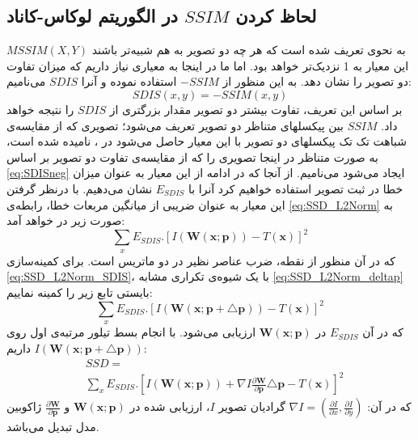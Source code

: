 \documentclass[11pt,a4paper,twocolumn]{article}
\newcommand{\warp}{\mathbf{W}(\mathbf{x};\mathbf{p})}
\newcommand{\IWarp}{I(\mathbf{W}(\mathbf{x};\mathbf{p}))}
\newcommand{\round}[2]{\frac{\partial{#1}}{\partial{#2}}}
\newcommand{\roundB}[2]{\frac{\partial{\mathbf{#1}}}{\partial{\mathbf{#2}}}}
\begin{document}
\subsection{لحاظ کردن $SSIM$ در الگوریتم لوکاس-کاناد}
$MSSIM(X,Y)$ به نحوی تعریف شده است که هر چه دو تصویر به هم شبیه‌تر باشند این معیار به 1 نزدیک‌تر خواهد بود. اما ما در اینجا به معیاری نیاز داریم که میزان تفاوت دو تصویر را نشان دهد. به این منظور از $-SSIM$ استفاده نموده و آنرا $SDIS$ می‌نامیم:
\begin{equation}\label{eq:SDISneg}
    SDIS(x,y) = -SSIM(x,y)
\end{equation}
بر اساس این تعریف، تفاوت بیشتر دو تصویر مقدار بزرگتری از $SDIS$ را نتیجه خواهد داد.
$SSIM$ بین پیکسلهای متناظر دو تصویر تعریف می‌شود؛ تصویری که از مقایسه‌ی شباهت تک‌ تک پیکسلهای دو تصویر با این معیار حاصل می‌شود در \cite{Wang04image}،  نامیده شده است، به صورت متناظر در اینجا تصویری را که از مقایسه‌ی تفاوت دو تصویر بر اساس \eqref{eq:SDISneg} ایجاد می‌شود  می‌نامیم. از آنجا که در ادامه از این معیار به عنوان میزان خطا در ثبت تصویر استفاده خواهیم کرد آنرا با $E_{SDIS}$ نشان می‌دهیم.  با درنظر گرفتن این معیار به عنوان ضریبی از میانگین مربعات خطا، رابطه‌ی \eqref{eq:SSD_L2Norm} به صورت زیر در خواهد آمد:
\begin{equation}\label{eq:SSD_L2Norm_SDIS}
    \sum_x E_{SDIS}.[\IWarp-T(\mathbf{x})]^2
\end{equation}
که در آن منظور از نقطه، ضرب عناصر نظیر در دو ماتریس است. برای کمینه‌سازی \eqref{eq:SSD_L2Norm_SDIS}، با یک شیوه‌ی تکراری مشابه \eqref{eq:SSD_L2Norm_deltap} بایستی تابع زیر را کمینه نماییم:
\begin{equation}\label{eq:SSD_SDIS_deltap}
    \sum_x E_{SDIS}.[I(\mathbf{W}(\mathbf{x;\mathbf{p+\triangle p}}))-T(\mathbf{x})]^2
\end{equation}
که در آن $E_{SDIS}$ در $\warp$ ارزیابی می‌شود. با انجام بسط تیلور مرتبه‌ی اول روی $I(\mathbf{W}(\mathbf{x;\mathbf{p+\triangle p}}))$ داریم:
\begin{align}
    &SSD =\label{eq:SSD_SDIS_Taylor} \\
	&\sum_x E_{SDIS}.[\IWarp+\nabla I\roundB{W}{p}\triangle \mathbf{p}-T(\mathbf{x})]^2 \nonumber
\end{align}
که در آن:
$\nabla I=(\round{I}{x},\round{I}{y})$ گرادیان تصویر $I$، ارزیابی شده در $\warp$ و $\roundB{W}{p}$ ژاکوبین مدل تبدیل می‌باشد.
\end{document}
